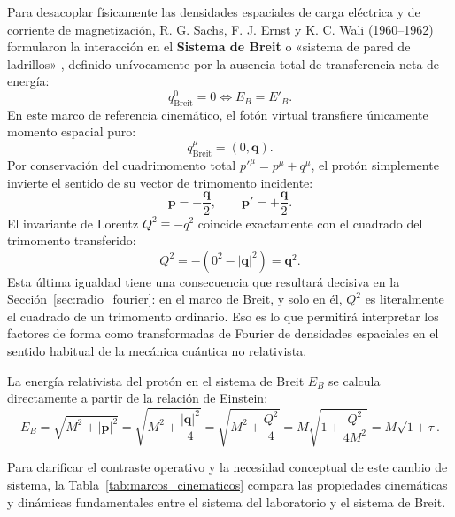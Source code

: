 \documentclass[10pt,a4paper]{article}
\begin{document}
Para desacoplar físicamente las densidades espaciales de carga eléctrica y de corriente de magnetización, R. G. Sachs, F. J. Ernst y K. C. Wali (1960--1962) formularon la interacción en el \textbf{Sistema de Breit} o «sistema de pared de ladrillos» \cite{ernst1960,sachs1962,halzen1984,perdrisat2007}, definido unívocamente por la ausencia total de transferencia neta de energía:
\begin{equation}
q^0_{\text{Breit}} = 0 \iff E_B = E'_B.
\end{equation}
En este marco de referencia cinemático, el fotón virtual transfiere únicamente momento espacial puro:
\begin{equation}
q^\mu_{\text{Breit}} = (0, \mathbf{q}).
\end{equation}
Por conservación del cuadrimomento total $p'^\mu = p^\mu + q^\mu$, el protón simplemente invierte el sentido de su vector de trimomento incidente:
\begin{equation}
\mathbf{p} = -\frac{\mathbf{q}}{2}, \qquad \mathbf{p}' = +\frac{\mathbf{q}}{2}.
\end{equation}
El invariante de Lorentz $Q^2 \equiv -q^2$ coincide exactamente con el cuadrado del trimomento transferido:
\begin{equation}
Q^2 = - (0^2 - |\mathbf{q}|^2) = \mathbf{q}^2.
\end{equation}
Esta última igualdad tiene una consecuencia que resultará decisiva en la Sección~\ref{sec:radio_fourier}: en el marco de Breit, y solo en él, $Q^2$ es literalmente el cuadrado de un trimomento ordinario. Eso es lo que permitirá interpretar los factores de forma como transformadas de Fourier de densidades espaciales en el sentido habitual de la mecánica cuántica no relativista.

La energía relativista del protón en el sistema de Breit $E_B$ se calcula directamente a partir de la relación de Einstein:
\begin{equation}
E_B = \sqrt{M^2 + |\mathbf{p}|^2} = \sqrt{M^2 + \frac{|\mathbf{q}|^2}{4}} = \sqrt{M^2 + \frac{Q^2}{4}} = M \sqrt{1 + \frac{Q^2}{4M^2}} = M \sqrt{1 + \tau}.
\label{eq:EB_energy}
\end{equation}

Para clarificar el contraste operativo y la necesidad conceptual de este cambio de sistema, la Tabla~\ref{tab:marcos_cinematicos} compara las propiedades cinemáticas y dinámicas fundamentales entre el sistema del laboratorio y el sistema de Breit.
\end{document}
